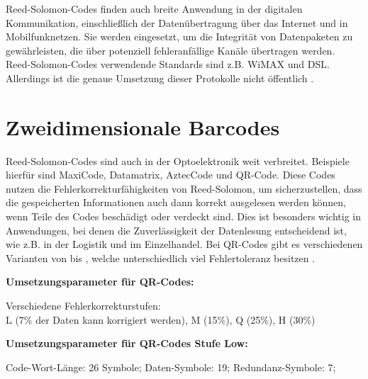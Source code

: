 Reed-Solomon-Codes finden auch breite Anwendung in der digitalen Kommunikation, einschließlich der Datenübertragung über das Internet und in Mobilfunknetzen. 
Sie werden eingesetzt, um die Integrität von Datenpaketen zu gewährleisten, die über potenziell fehleranfällige Kanäle übertragen werden. 
Reed-Solomon-Codes verwendende Standards sind z.B. WiMAX und DSL.
Allerdings ist die genaue Umsetzung dieser Protokolle nicht öffentlich \cite{vermillionEndtoEndDSLArchitectures}.

\section{Zweidimensionale Barcodes}

Reed-Solomon-Codes sind auch in der Optoelektronik weit verbreitet. Beispiele hierfür sind MaxiCode, Datamatrix, AztecCode und QR-Code. 
Diese Codes nutzen die Fehlerkorrekturfähigkeiten von Reed-Solomon, um sicherzustellen, dass die gespeicherten Informationen auch dann korrekt ausgelesen werden können, wenn Teile des Codes beschädigt oder verdeckt sind. 
Dies ist besonders wichtig in Anwendungen, bei denen die Zuverlässigkeit der Datenlesung entscheidend ist, wie z.B. in der Logistik und im Einzelhandel.
Bei QR-Codes gibt es verschiedenen Varianten von  bis , welche unterschiedlich viel Fehlertoleranz besitzen \cite{QRCode2024}.

\textbf{Umsetzungsparameter für QR-Codes:}

Verschiedene Fehlerkorrekturstufen: \\ L (7\% der Daten kann korrigiert werden), M (15\%), Q (25\%), H (30\%)

\textbf{Umsetzungsparameter für QR-Codes Stufe Low:}

Code-Wort-Länge: 26 Symbole;
Daten-Symbole: 19;
Redundanz-Symbole: 7;

